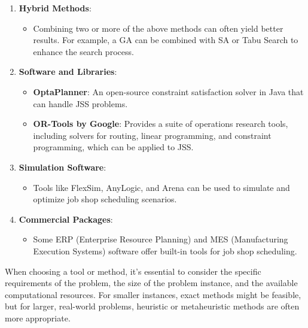 \begin{enumerate}
    \item \textbf{Hybrid Methods}:
    \begin{itemize}
        \item Combining two or more of the above methods can often yield better results. For example, a GA can be combined with SA or Tabu Search to enhance the search process.
    \end{itemize}

    \item \textbf{Software and Libraries}:
    \begin{itemize}
        \item \textbf{OptaPlanner}: An open-source constraint satisfaction solver in Java that can handle JSS problems.
        \item \textbf{OR-Tools by Google}: Provides a suite of operations research tools, including solvers for routing, linear programming, and constraint programming, which can be applied to JSS.
    \end{itemize}

    \item \textbf{Simulation Software}:
    \begin{itemize}
        \item Tools like FlexSim, AnyLogic, and Arena can be used to simulate and optimize job shop scheduling scenarios.
    \end{itemize}

    \item \textbf{Commercial Packages}:
    \begin{itemize}
        \item Some ERP (Enterprise Resource Planning) and MES (Manufacturing Execution Systems) software offer built-in tools for job shop scheduling.
    \end{itemize}
\end{enumerate}

When choosing a tool or method, it's essential to consider the specific requirements of the problem, the size of the problem instance, and the available computational resources. For smaller instances, exact methods might be feasible, but for larger, real-world problems, heuristic or metaheuristic methods are often more appropriate.


